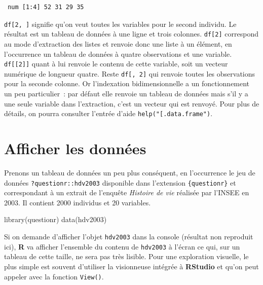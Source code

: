 \documentclass[
  letterpaper,
  DIV=11,
  numbers=noendperiod,
  oneside]{scrreprt}
\newenvironment{Shaded}{\begin{snugshade}}{\end{snugshade}}
\newcommand{\FunctionTok}[1]{\textcolor[rgb]{0.28,0.35,0.67}{#1}}
\newcommand{\NormalTok}[1]{\textcolor[rgb]{0.00,0.23,0.31}{#1}}
\begin{document}
\begin{tcolorbox}
\begin{verbatim}
 num [1:4] 52 31 29 35
\end{verbatim}

\texttt{df{[}2,\ {]}} signifie qu'on veut toutes les variables pour le
second individu. Le résultat est un tableau de données à une ligne et
trois colonnes. \texttt{df{[}2{]}} correspond au mode d'extraction des
listes et renvoie donc une liste à un élément, en l'occurrence un
tableau de données à quatre observations et une variable.
\texttt{df{[}{[}2{]}{]}} quant à lui renvoie le contenu de cette
variable, soit un vecteur numérique de longueur quatre. Reste
\texttt{df{[},\ 2{]}} qui renvoie toutes les observations pour la
seconde colonne. Or l'indexation bidimensionnelle a un fonctionnement un
peu particulier~: par défaut elle renvoie un tableau de données mais
s'il y a une seule variable dans l'extraction, c'est un vecteur qui est
renvoyé. Pour plus de détails, on pourra consulter l'entrée d'aide
\texttt{help("{[}.data.frame")}.

\end{tcolorbox}

\hypertarget{sec-afficher-donnees}{%
\section{Afficher les données}\label{sec-afficher-donnees}}

Prenons un tableau de données un peu plus conséquent, en l'occurrence le
jeu de données \texttt{?questionr::hdv2003} disponible dans l'extension
\texttt{\{questionr\}} et correspondant à un extrait de l'enquête
\emph{Histoire de vie} réalisée par l'INSEE en 2003. Il contient 2000
individus et 20 variables.

\begin{Shaded}
\begin{Highlighting}[]
\FunctionTok{library}\NormalTok{(questionr)}
\FunctionTok{data}\NormalTok{(hdv2003)}
\end{Highlighting}
\end{Shaded}

Si on demande d'afficher l'objet \texttt{hdv2003} dans la console
(résultat non reproduit ici), \textbf{R} va afficher l'ensemble du
contenu de \texttt{hdv2003} à l'écran ce qui, sur un tableau de cette
taille, ne sera pas très lisible. Pour une exploration visuelle, le plus
simple est souvent d'utiliser la visionneuse intégrée à \textbf{RStudio}
et qu'on peut appeler avec la fonction \texttt{View()}.
\end{document}
